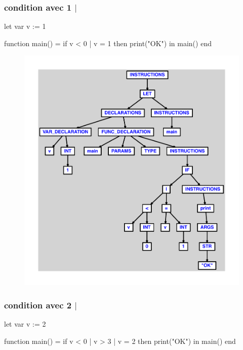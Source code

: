 \documentclass{article}
\begin{document}
\subsubsection{condition avec 1 $ | $}
\begin{verbatimtab}
let
	var v := 1

	function main() =
		if v < 0 | v = 1 then print("OK")
in main() end
\end{verbatimtab}
\begin{figure}[H]\centering\includegraphics[max width=\textwidth]{ast/ast_273.pdf}\end{figure}\subsubsection{condition avec 2 $ | $}
\begin{verbatimtab}
let
	var v := 2

	function main() =
		if v < 0 | v > 3 | v = 2 then print("OK")
in main() end
\end{verbatimtab}
\end{document}
